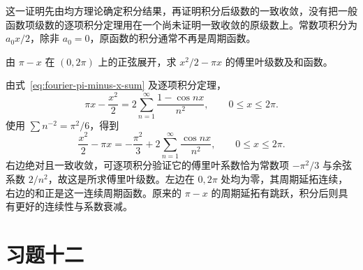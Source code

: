 这一证明先由均方理论确定积分结果，再证明积分后级数的一致收敛，没有把一般函数项级数的逐项积分定理用在一个尚未证明一致收敛的原级数上。常数项积分为 $a_0x/2$，除非 $a_0=0$，原函数的积分通常不再是周期函数。

\begin{example}
\label{ex:fourier-integrated-sawtooth}
由 $\pi-x$ 在 $(0,2\pi)$ 上的正弦展开，求 $x^2/2-\pi x$ 的傅里叶级数及和函数。
\end{example}

\begin{solve}
由式~\eqref{eq:fourier-pi-minus-x-sum} 及逐项积分定理，
\[
    \pi x-\frac{x^2}{2}
       =2\sum_{n=1}^\infty\frac{1-\cos nx}{n^2},
       \qquad 0\leq x\leq2\pi.
\]
使用 $\sum n^{-2}=\pi^2/6$，得到
\begin{equation}
    \frac{x^2}{2}-\pi x
       =-\frac{\pi^2}{3}
           +2\sum_{n=1}^\infty\frac{\cos nx}{n^2},
       \qquad 0\leq x\leq2\pi.
    \label{eq:fourier-integrated-sawtooth}
\end{equation}
右边绝对且一致收敛，可逐项积分验证它的傅里叶系数恰为常数项 $-\pi^2/3$ 与余弦系数 $2/n^2$，故这是所求傅里叶级数。左边在 $0,2\pi$ 处均为零，其周期延拓连续，右边的和正是这一连续周期函数。原来的 $\pi-x$ 的周期延拓有跳跃，积分后则具有更好的连续性与系数衰减。
\end{solve}

\section*{习题十二}
